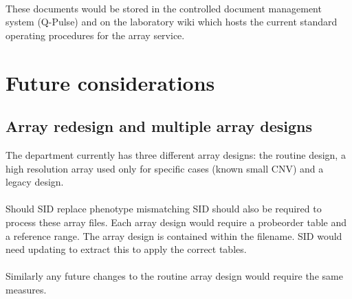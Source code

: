 \paragraph*{}
These documents would be stored in the controlled document management system (Q-Pulse) and on the laboratory wiki which hosts the current standard operating procedures for the array service.

\section{Future considerations}
\subsection{Array redesign and multiple array designs}
The department currently has three different array designs: the routine design, a high resolution array used only for specific cases (known small CNV) and a legacy design. 
\paragraph*{}
Should SID replace phenotype mismatching SID should also be required to process these array files. Each array design would require a probeorder table and a reference range. The array design is contained within the filename. SID would need updating to extract this to apply the correct tables.
\paragraph*{}
Similarly any future changes to the routine array design would require the same measures.